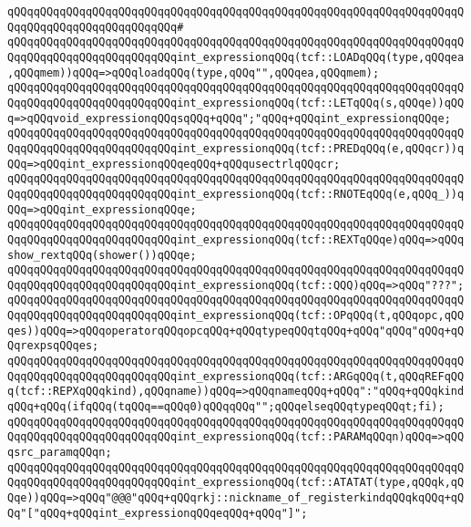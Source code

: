\verb|qQQqqQQqqQQqqQQqqQQqqQQqqQQqqQQqqQQqqQQqqQQqqQQqqQQqqQQqqQQqqQQqqQQqqQQqqQQqqQQqqQQqqQQqqQQqqQQq#|\newline
\verb|qQQqqQQqqQQqqQQqqQQqqQQqqQQqqQQqqQQqqQQqqQQqqQQqqQQqqQQqqQQqqQQqqQQqqQQqqQQqqQQqqQQqqQQqqQQqqQQqint_expressionqQQq(tcf::LOADqQQq(type,qQQqea,qQQqmem))qQQq=>qQQqloadqQQq(type,qQQq"",qQQqea,qQQqmem);|\newline
\verb|qQQqqQQqqQQqqQQqqQQqqQQqqQQqqQQqqQQqqQQqqQQqqQQqqQQqqQQqqQQqqQQqqQQqqQQqqQQqqQQqqQQqqQQqqQQqqQQqint_expressionqQQq(tcf::LETqQQq(s,qQQqe))qQQq=>qQQqvoid_expressionqQQqsqQQq+qQQq";"qQQq+qQQqint_expressionqQQqe;|\newline
\verb|qQQqqQQqqQQqqQQqqQQqqQQqqQQqqQQqqQQqqQQqqQQqqQQqqQQqqQQqqQQqqQQqqQQqqQQqqQQqqQQqqQQqqQQqqQQqqQQqint_expressionqQQq(tcf::PREDqQQq(e,qQQqcr))qQQq=>qQQqint_expressionqQQqeqQQq+qQQqusectrlqQQqcr;|\newline
\verb|qQQqqQQqqQQqqQQqqQQqqQQqqQQqqQQqqQQqqQQqqQQqqQQqqQQqqQQqqQQqqQQqqQQqqQQqqQQqqQQqqQQqqQQqqQQqqQQqint_expressionqQQq(tcf::RNOTEqQQq(e,qQQq_))qQQq=>qQQqint_expressionqQQqe;|\newline
\verb|qQQqqQQqqQQqqQQqqQQqqQQqqQQqqQQqqQQqqQQqqQQqqQQqqQQqqQQqqQQqqQQqqQQqqQQqqQQqqQQqqQQqqQQqqQQqqQQqint_expressionqQQq(tcf::REXTqQQqe)qQQq=>qQQqshow_rextqQQq(shower())qQQqe;|\newline
\verb|qQQqqQQqqQQqqQQqqQQqqQQqqQQqqQQqqQQqqQQqqQQqqQQqqQQqqQQqqQQqqQQqqQQqqQQqqQQqqQQqqQQqqQQqqQQqqQQqint_expressionqQQq(tcf::QQQ)qQQq=>qQQq"???";|\newline
\verb|qQQqqQQqqQQqqQQqqQQqqQQqqQQqqQQqqQQqqQQqqQQqqQQqqQQqqQQqqQQqqQQqqQQqqQQqqQQqqQQqqQQqqQQqqQQqqQQqint_expressionqQQq(tcf::OPqQQq(t,qQQqopc,qQQqes))qQQq=>qQQqoperatorqQQqopcqQQq+qQQqtypeqQQqtqQQq+qQQq"qQQq"qQQq+qQQqrexpsqQQqes;|\newline
\verb|qQQqqQQqqQQqqQQqqQQqqQQqqQQqqQQqqQQqqQQqqQQqqQQqqQQqqQQqqQQqqQQqqQQqqQQqqQQqqQQqqQQqqQQqqQQqqQQqint_expressionqQQq(tcf::ARGqQQq(t,qQQqREFqQQq(tcf::REPXqQQqkind),qQQqname))qQQq=>qQQqnameqQQq+qQQq":"qQQq+qQQqkindqQQq+qQQq(ifqQQq(tqQQq==qQQq0)qQQqqQQq"";qQQqelseqQQqtypeqQQqt;fi);|\newline
\verb|qQQqqQQqqQQqqQQqqQQqqQQqqQQqqQQqqQQqqQQqqQQqqQQqqQQqqQQqqQQqqQQqqQQqqQQqqQQqqQQqqQQqqQQqqQQqqQQqint_expressionqQQq(tcf::PARAMqQQqn)qQQq=>qQQqsrc_paramqQQqn;|\newline
\verb|qQQqqQQqqQQqqQQqqQQqqQQqqQQqqQQqqQQqqQQqqQQqqQQqqQQqqQQqqQQqqQQqqQQqqQQqqQQqqQQqqQQqqQQqqQQqqQQqint_expressionqQQq(tcf::ATATAT(type,qQQqk,qQQqe))qQQq=>qQQq"@@@"qQQq+qQQqrkj::nickname_of_registerkindqQQqkqQQq+qQQq"["qQQq+qQQqint_expressionqQQqeqQQq+qQQq"]";|\newline
